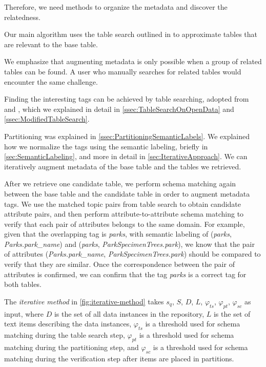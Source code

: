 Therefore, we need methods to organize the metadata and discover the relatedness.

Our main algorithm uses the table search outlined in \cite{Mudgal2018Deep} to approximate tables that are relevant to the base table.

We emphasize that augmenting metadata is only possible when a group of related tables can be found. A user who manually searches for related tables would encounter the same challenge.

Finding the interesting tags can be achieved by table searching, adopted from \cite{Nargesian2018Table} and \cite{conf/esws/EllefiBDT16}, which we explained in detail in \autoref{ssec:TableSearchOnOpenData} and \autoref{ssec:ModifiedTableSearch}.

Partitioning was explained in \autoref{ssec:PartitioningSemanticLabels}. We explained how we normalize the tags using the semantic labeling, briefly in \autoref{sec:SemanticLabeling}, and more in detail in \autoref{sec:IterativeApproach}. We can iteratively augment metadata of the base table and the tables we retrieved.

After we retrieve one candidate table, we perform schema matching again between the base table and the candidate table in order to augment metadata tags. We use the matched topic pairs from table search to obtain candidate attribute pairs, and then perform attribute-to-attribute schema matching to verify that each pair of attributes belongs to the same domain. For example, given that the overlapping tag is \textit{parks}, with semantic labeling of (\textit{parks}, \textit{Parks.park\_name}) and (\textit{parks}, \textit{Park\-Specimen\-Trees.park}), we know that the pair of attributes (\textit{Parks.park\_name}, \textit{Park\-Specimen\-Trees.park}) should be compared to verify that they are similar. Once the correspondence between the pair of attributes is confirmed, we can confirm that the tag \textit{parks} is a correct tag for both tables.

The \textit{iterative method} in \autoref{fig:iterative-method} takes $s_q$, $S$, $D$, $L$, $\ensuremath{\varphi}_{ts}$, $\ensuremath{\varphi}_{pt}$, $\ensuremath{\varphi}_{sc}$ as input, where $D$ is the set of all data instances in the repository, $L$ is the set of text items describing the data instances, $\ensuremath{\varphi}_{ts}$ is a threshold used for schema matching during the table search step, $\ensuremath{\varphi}_{pt}$ is a threshold used for schema matching during the partitioning step, and $\ensuremath{\varphi}_{sc}$ is a threshold used for schema matching during the verification step after items are placed in partitions.


